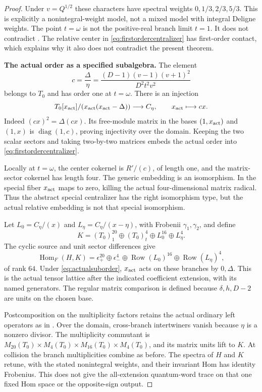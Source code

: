 \begin{proof}
Under $v=Q^{1/2}$ these characters have spectral
weights $0,1/3,2/3,5/3$.
This is explicitly a nonintegral-weight model,
not a mixed model with integral Deligne weights.
The point $t=\omega$ is not the positive-real
branch limit $t=1$.
It does not contradict .
The relative center in
\eqref{eq:firstordercentralizer} has first-order
contact, which explains why it also does not
contradict the present theorem.

\par\smallskip\noindent\textbf{The actual order as a specified subalgebra.}\quad
The element
\[
 c=\frac{\Delta}{\eta}
   =\frac{(D-1)(v-1)(v+1)^2}{D^2t^2v^2}
\]
belongs to $T_0$ and has order one at $t=\omega$.
There is an injection
\begin{equation}\label{eq:actualsuborder}
 T_0[x_{\rm act}]/(x_{\rm act}(x_{\rm act}-\Delta))
   \longrightarrow C_\eta,\qquad x_{\rm act}\longmapsto cx.
\end{equation}
Indeed $(cx)^2=\Delta(cx)$.
Its free-module matrix in the bases $(1,x_{\rm act})$
and $(1,x)$ is $\operatorname{diag}(1,c)$, proving
injectivity over the domain.
Keeping the two scalar sectors and taking two-by-two
matrices embeds the actual order into
\eqref{eq:firstordercentralizer}.

Locally at $t=\omega$, the center cokernel is
$R'/(c)$, of length one, and the matrix-sector
cokernel has length four.
The generic embedding is an isomorphism.
In the special fiber $x_{\rm act}$ maps to zero,
killing the actual four-dimensional matrix radical.
Thus the abstract special centralizer has the right
isomorphism type, but the actual relative embedding
is not that special isomorphism.

Let $L_0=C_\eta/(x)$ and $L_\eta=C_\eta/(x-\eta)$,
with Frobenii $\gamma_1,\gamma_2$, and define
\[
 K=(T_0)_1^{20}\oplus(T_0)_t^4
       \oplus L_0^{16}\oplus L_\eta^4.
\]
The cyclic source and unit sector differences give
\[
 \operatorname{Hom}_F(H,K)
  =\epsilon_+^{20}\oplus\epsilon_-^4
       \oplus\operatorname{Row}(L_0)^{16}
       \oplus\operatorname{Row}(L_\eta)^4,
\]
of rank $64$.
Under \eqref{eq:actualsuborder}, $x_{\rm act}$ acts
on these branches by $0,\Delta$.
This is the actual  tensor lattice after
the indicated coefficient extension, with its named
generators. The regular matrix comparison is defined
because $\delta,h,D-2$ are units on the chosen base.

Postcomposition on the multiplicity factors retains
the actual ordinary left operators as in .
Over the domain, cross-branch intertwiners vanish
because $\eta$ is a nonzero divisor.
The multiplicity commutant is
$M_{20}(T_0)\times M_4(T_0)\times
 M_{16}(T_0)\times M_4(T_0)$, and its matrix units
lift to $K$.
At collision the branch multiplicities combine as
before. The spectra of $H$ and $K$ retune, with the
stated nonintegral weights, and their invariant Hom
has identity Frobenius.
This does not give the all-extension quantum-word
trace on that one fixed Hom space or the
 opposite-sign output.


\end{proof}
